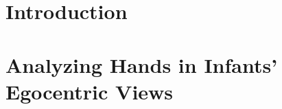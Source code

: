 \documentclass{iuphd_proposal}
\begin{document}
\begin{abstract}
\end{abstract}

\tableofcontents

\chapter{Introduction}


\chapter{Analyzing Hands in Infants' Egocentric Views}
% 
% 
% 
% 
% 
% 
% 
% 
% 





%
\end{document}
